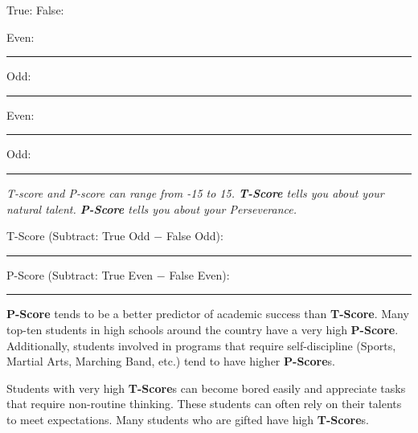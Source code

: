 \documentclass[letterpaper, 12pt]{article}
\begin{document}
\vspace{.5in}
True: \hspace{4in} False:

Even: \rule{0.5in}{0.01in} Odd: \rule{0.5in}{0.01in} \hspace{2.45in} Even: \rule{0.5in}{0.01in} Odd: \rule{0.5in}{0.01in}
\vspace{.5in}

\begin{center}
\textit{T-score and P-score can range from -15 to 15.  \textbf{T-Score} tells you about your natural talent. \textbf{P-Score} tells you about your Perseverance.}
\end{center}


T-Score (Subtract: True Odd $ - $ False Odd): \rule{0.5in}{0.01in}

\vspace{.5in}
P-Score (Subtract: True Even $ - $ False Even): \rule{0.5in}{0.01in}
\vspace{.25in}

\textbf{P-Score} tends to be a better predictor of academic success than \textbf{T-Score}.  Many top-ten students in high schools around the country have a very high \textbf{P-Score}.  Additionally, students involved in programs that require self-discipline (Sports, Martial Arts, Marching Band, etc.) tend to have higher \textbf{P-Score}s.  

Students with very high \textbf{T-Score}s can become bored easily and appreciate tasks that require non-routine thinking.  These students can often rely on their talents to meet expectations. Many students who are gifted have high \textbf{T-Score}s.
\end{document}
